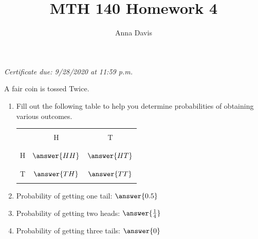 \documentclass{ximera}
\author{Anna Davis} \title{MTH 140 Homework 4}
\begin{document}
\begin{abstract}

\end{abstract}
\maketitle
 \textit{Certificate due: 9/28/2020 at 11:59 p.m.}

\begin{problem}\label{prob:140hom4prob1}
A fair coin is tossed Twice.  
\begin{enumerate}
    \item Fill out the following table to help you determine probabilities of obtaining various outcomes.
    
\begin{center}
\begin{tabular}{|c|c|c|}
 \hline
 &&   \\
 & H& T  \\
 &&   \\
  \hline
  &&\\
 H&$\answer{HH}$&$\answer{HT}$ \\
  && \\
 \hline
  &&\\
 T&$\answer{TH}$&$\answer{TT}$ \\
  && \\
 \hline
 \end{tabular}
\end{center}    
\item Probability of getting one tail: $\answer{0.5}$

\item Probability of getting two heads: $\answer{\frac{1}{4}}$
\item Probability of getting three tails: $\answer{0}$
\end{enumerate}
\end{problem}
\end{document}
